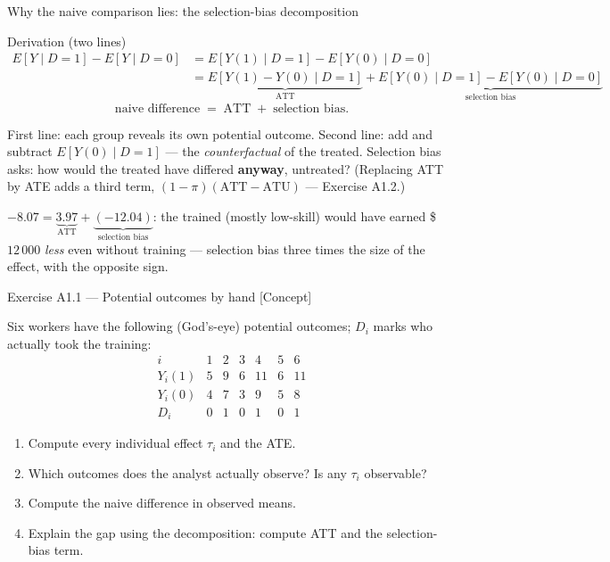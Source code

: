 \documentclass[aspectratio=169,11pt]{beamer}
\begin{document}
\begin{frame}{Why the naive comparison lies: the selection-bias decomposition}
  \footnotesize
  \begin{block}{Derivation (two lines)}
    \vspace{-6pt}
    \begin{align*}
      E[Y\mid D=1]-E[Y\mid D=0]
        &= E[Y(1)\mid D=1]-E[Y(0)\mid D=0] \\
        &= \underbrace{E[Y(1)-Y(0)\mid D=1]}_{\text{ATT}}
           + \underbrace{E[Y(0)\mid D=1]-E[Y(0)\mid D=0]}_{\text{selection bias}}
    \end{align*}
    \vspace{-8pt}
    \[
      \boxed{\;\text{naive difference} \;=\; \text{ATT} \;+\; \text{selection bias}.\;}
    \]
  \end{block}
  \begin{readme}
    \scriptsize
    First line: each group reveals its own potential outcome. Second line: add and
    subtract $E[Y(0)\mid D=1]$ --- the \emph{counterfactual} of the treated. Selection
    bias asks: how would the treated have differed \textbf{anyway}, untreated?
    (Replacing ATT by ATE adds a third term, $(1-\pi)(\text{ATT}-\text{ATU})$ ---
    Exercise A1.2.)
  \end{readme}
  \begin{numexample}
    $-8.07 = \underbrace{3.97}_{\text{ATT}} + \underbrace{(-12.04)}_{\text{selection bias}}$:
    the trained (mostly low-skill) would have earned \$$12\,000$ \emph{less} even without
    training --- selection bias three times the size of the effect, with the opposite sign.
  \end{numexample}
\end{frame}

\begin{frame}{Exercise A1.1 --- Potential outcomes by hand [Concept]}
\begin{exercise}
  Six workers have the following (God's-eye) potential outcomes; $D_i$ marks who actually
  took the training:
  \[
    \begin{array}{c|cccccc}
      i      & 1 & 2 & 3 & 4  & 5 & 6 \\ \hline
      Y_i(1) & 5 & 9 & 6 & 11 & 6 & 11 \\
      Y_i(0) & 4 & 7 & 3 & 9  & 5 & 8 \\
      D_i    & 0 & 1 & 0 & 1  & 0 & 1
    \end{array}
  \]
  \begin{enumerate}
    \item Compute every individual effect $\tau_i$ and the ATE.
    \item Which outcomes does the analyst actually observe? Is any $\tau_i$ observable?
    \item Compute the naive difference in observed means.
    \item Explain the gap using the decomposition: compute ATT and the selection-bias term.
  \end{enumerate}
\end{exercise}
\end{frame}
\end{document}
